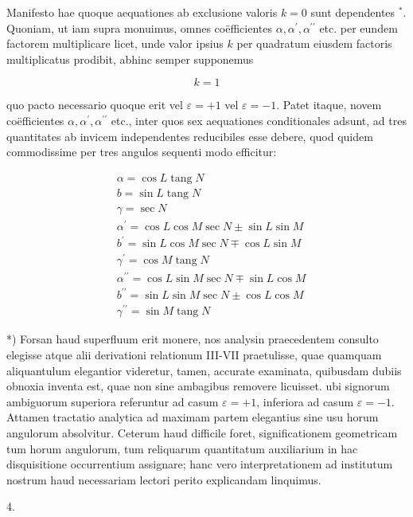 \documentclass[10pt]{article}
\begin{document}
Manifesto hae quoque aequationes ab exclusione valoris \(k=0\) sunt dependentes \({ }^{*}\). Quoniam, ut iam supra monuimus, omnes coëfficientes \(\alpha, \alpha^{\prime}, \alpha^{\prime \prime}\) etc. per eundem factorem multiplicare licet, unde valor ipsius \(k\) per quadratum eiusdem factoris multiplicatus prodibit, abhinc semper supponemus

\[
k=1
\]

quo pacto necessario quoque erit vel \(\varepsilon=+1\) vel \(\varepsilon=-1\). Patet itaque, novem coëfficientes \(\alpha, \alpha^{\prime}, \alpha^{\prime \prime}\) etc., inter quos sex aequationes conditionales adsunt, ad tres quantitates ab invicem independentes reducibiles esse debere, quod quidem commodissime per tres angulos sequenti modo efficitur:

\[
\begin{aligned}
& \alpha=\cos L \operatorname{tang} N \\
& b=\sin L \operatorname{tang} N \\
& \gamma=\sec N \\
& \alpha^{\prime}=\cos L \cos M \sec N \pm \sin L \sin M \\
& b^{\prime}=\sin L \cos M \sec N \mp \cos L \sin M \\
& \gamma^{\prime}=\cos M \operatorname{tang} N \\
& \alpha^{\prime \prime}=\cos L \sin M \sec N \mp \sin L \cos M \\
& b^{\prime \prime}=\sin L \sin M \sec N \pm \cos L \cos M \\
& \gamma^{\prime \prime}=\sin M \operatorname{tang} N
\end{aligned}
\]

*) Forsan haud superfluum erit monere, nos analysin praecedentem consulto elegisse atque alii derivationi relationum III-VII praetulisse, quae quamquam aliquantulum elegantior videretur, tamen, accurate examinata, quibusdam dubiis obnoxia inventa est, quae non sine ambagibus removere licuisset.
ubi signorum ambiguorum superiora referuntur ad casum \(\varepsilon=+1\), inferiora ad casum \(\varepsilon=-1\). Attamen tractatio analytica ad maximam partem elegantius sine usu horum angulorum absolvitur. Ceterum haud difficile foret, significationem geometricam tum horum angulorum, tum reliquarum quantitatum auxiliarium in hac disquisitione occurrentium assignare; hanc vero interpretationem ad institutum nostrum haud necessariam lectori perito explicandam linquimus.

4.
\end{document}
